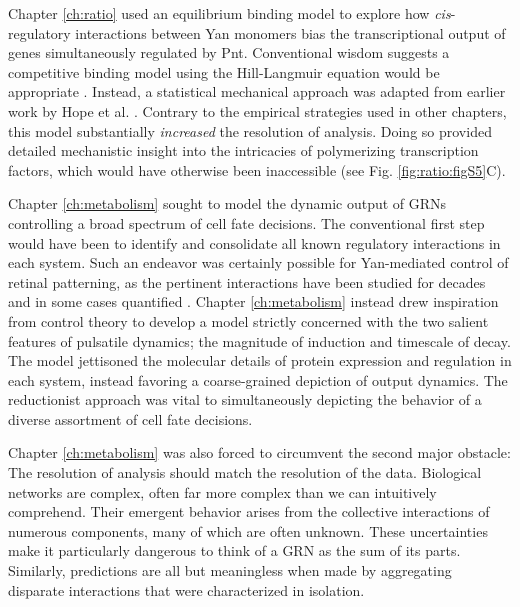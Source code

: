 Chapter \ref{ch:ratio} used an equilibrium binding model to explore how \textit{cis}-regulatory interactions between Yan monomers bias the transcriptional output of genes simultaneously regulated by Pnt. Conventional wisdom suggests a competitive binding model using the Hill-Langmuir equation would be appropriate \cite{Gesztelyi2012}. Instead, a statistical mechanical approach was adapted from earlier work by Hope et al. \cite{Hope2017}. Contrary to the empirical strategies used in other chapters, this model substantially \emph{increased} the resolution of analysis. Doing so provided detailed mechanistic insight into the intricacies of polymerizing transcription factors, which would have otherwise been inaccessible (see Fig. \ref{fig:ratio:figS5}C). 

Chapter \ref{ch:metabolism} sought to model the dynamic output of GRNs controlling a broad spectrum of cell fate decisions. The conventional first step would have been to identify and consolidate all known regulatory interactions in each system. Such an endeavor was certainly possible for Yan-mediated control of retinal patterning, as the pertinent interactions have been studied for decades \cite{Ready1976a,Rebay1995,Rohrbaugh2002,Li2009b,BoisclairLachance2014} and in some cases quantified \cite{Pelaez2015a}. Chapter \ref{ch:metabolism} instead drew inspiration from control theory to develop a model strictly concerned with the two salient features of pulsatile dynamics; the magnitude of induction and timescale of decay. The model jettisoned the molecular details of protein expression and regulation in each system, instead favoring a coarse-grained depiction of output dynamics. The reductionist approach was vital to simultaneously depicting the behavior of a diverse assortment of cell fate decisions.

Chapter \ref{ch:metabolism} was also forced to circumvent the second major obstacle: The resolution of analysis should match the resolution of the data. Biological networks are complex, often far more complex than we can intuitively comprehend. Their emergent behavior arises from the collective interactions of numerous components, many of which are often unknown. These uncertainties make it particularly dangerous to think of a GRN as the sum of its parts. Similarly, predictions are all but meaningless when made by aggregating disparate interactions that were characterized in isolation.

